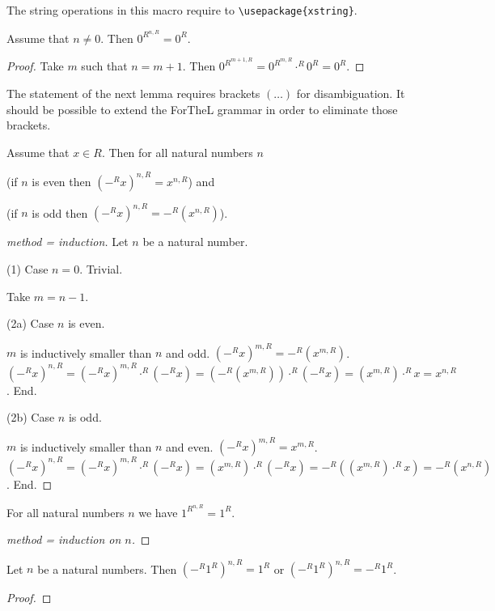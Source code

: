 \documentclass[english,11pt]{article}
\begin{document}
\noindent The string operations in this macro require to 
\verb|\usepackage{xstring}|.

\begin{forthel}
\begin{lemma} Assume that $n \neq 0$. Then $0^{R}^{n,R} = 0^{R}$. \end{lemma}
\begin{proof}
Take $m$ such that
$n = m + 1$. Then $0^{R}^{m+1,R} = 0^{R}^{m,R} \cdot^{R} 0^{R}
= 0^{R}$.
\end{proof}
\end{forthel}
%
The statement of the next lemma requires brackets $(\dots)$ for
disambiguation. It should be possible to extend the ForTheL grammar in
order to eliminate those brackets.
%
\begin{forthel}
\begin{lemma}
Assume that $x \in R$. Then for all natural numbers $n$

(if $n$ is even then $(-^{R}x)^{n,R} = x^{n,R}$)
and 

(if $n$ is odd then $(-^{R}x)^{n,R} = -^{R}(x^{n,R})$).
\end{lemma}
\begin{proof}[method = induction]
Let $n$ be a natural number.

(1) Case $n = 0$. Trivial.

Take $m = n - 1$.

(2a) Case $n$ is even. 

$m$ is inductively smaller than $n$ and odd.
$(-^{R}x)^{m,R} = -^{R}(x^{m,R})$.
$(-^{R}x)^{n,R} = (-^{R}x)^{m,R} \cdot^{R} (-^{R}x) = (-^{R}(x^{m,R})) \cdot^{R} (-^{R}x)
= (x^{m,R}) \cdot^{R} x = x^{n,R}$.
End.

(2b) Case $n$ is odd. 

$m$ is inductively smaller than $n$ and even.
$(-^{R}x)^{m,R} = x^{m,R}$.
$(-^{R}x)^{n,R} = (-^{R}x)^{m,R} \cdot^{R} (-^{R}x) = (x^{m,R}) \cdot^{R} (-^{R}x)
= -^{R} ((x^{m,R}) \cdot^{R} x) = -^{R}(x^{n,R})$.
End.

\end{proof}

\begin{lemma} For all natural numbers $n$ we have $1^{R}^{n,R} = 1^{R}$. \end{lemma}
\begin{proof}[method = induction on $n$]
\end{proof}

\begin{lemma} Let $n$ be a natural numbers. Then $(-^{R} 1^{R})^{n,R} = 1^{R}$
or $(-^{R} 1^{R})^{n,R} = -^{R} 1^{R}$. 
\end{lemma}
\begin{proof}
\end{proof}


\end{forthel}
\end{document}
